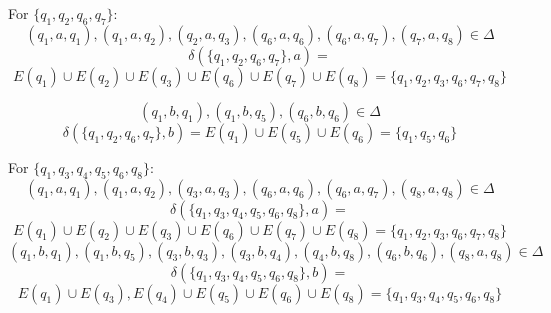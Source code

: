 \documentclass[12pt]{article}
\begin{document}
For $\{q_1, q_2, q_6, q_7\}$:
\begin{equation*}
	(q_1, a, q_1), (q_1, a, q_2), (q_2, a, q_3), (q_6, a, q_6), (q_6, a, q_7), (q_7, a, q_8) \in \Delta
\end{equation*}
\begin{equation*}
	\delta (\{q_1, q_2, q_6, q_7\}, a) =
\end{equation*}
\begin{equation*}
	 E(q_1) \cup E(q_2) \cup E(q_3) \cup E(q_6) \cup E(q_7) \cup E(q_8) = \{q_1, q_2, q_3, q_6, q_7, q_8\}
\end{equation*}

\begin{equation*}
	(q_1, b, q_1), (q_1, b, q_5), (q_6,b,q_6) \in \Delta
\end{equation*}
\begin{equation*}
	\delta (\{q_1, q_2, q_6, q_7\}, b) = E(q_1) \cup E(q_5) \cup E(q_6) = \{q_1, q_5, q_6\}
\end{equation*}

For $\{q_1, q_3, q_4, q_5, q_6, q_8\}$:
\begin{equation*}
	(q_1,a,q_1), (q_1, a, q_2), (q_3, a, q_3), (q_6, a, q_6), (q_6, a, q_7), (q_8, a, q_8) \in \Delta
\end{equation*}
\begin{equation*}
	\delta (\{q_1, q_3, q_4, q_5, q_6, q_8\}, a) = 
\end{equation*}
\begin{equation*}
	E(q_1) \cup E(q_2) \cup E(q_3) \cup E(q_6) \cup E(q_7) \cup E(q_8) = \{q_1, q_2, q_3, q_6, q_7, q_8\}
\end{equation*}
\begin{equation*}
	(q_1,b,q_1), (q_1, b, q_5), (q_3, b, q_3), (q_3, b, q_4), (q_4, b, q_8), (q_6, b, q_6), (q_8, a, q_8) \in \Delta
\end{equation*}
\begin{equation*}
	\delta (\{q_1, q_3, q_4, q_5, q_6, q_8\}, b) = 
\end{equation*}
\begin{equation*}
	E(q_1) \cup E(q_3), E(q_4) \cup E(q_5) \cup E(q_6) \cup E(q_8) = \{q_1, q_3, q_4, q_5, q_6, q_8\}
\end{equation*}
\end{document}
